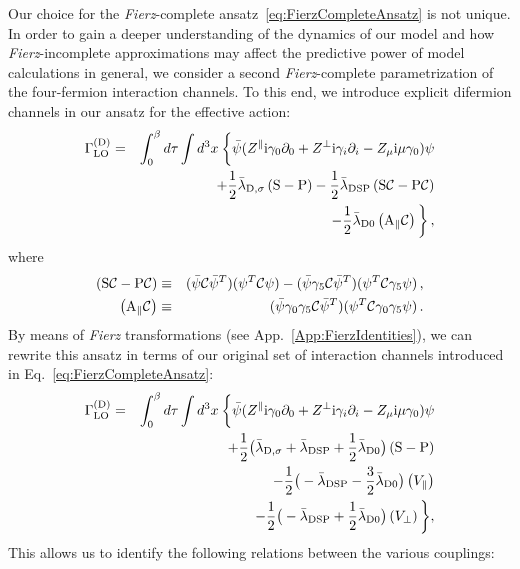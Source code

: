 \documentclass[prd,english,preprintnumbers,amsmath,amssymb,nofootinbib,twocolumn,superscriptaddress]{revtex4-1}
\def\CC{{\mathcal C}}
\newcommand{\I}{\mathrm{i}}
\newcommand{\be}{\begin{eqnarray}}
\newcommand{\ee}{\end{eqnarray}}
\newcommand{\del}{\partial}
\newcommand{\nn}{\nonumber }
\newcommand{\psib}{\bar{\psi}}
\begin{document}
{{Our choice for the {\it Fierz}-complete ansatz~\eqref{eq:FierzCompleteAnsatz} is not unique. In order to gain a deeper understanding of
the dynamics of our model and how {\it Fierz}-incomplete approximations may affect the predictive power of model calculations
in general, we consider a second {\it Fierz}-complete parametrization of the four-fermion interaction channels. To this end, 
we introduce explicit difermion channels in our ansatz for the effective {action: 
%
\be
\Gamma_\text{LO}^\text{(D)} &=&  \int_0 ^\beta d \tau  \int d^3 x \: \bigg \lbrace \psib ( Z^\parallel \I \gamma_0 \del_0 + Z^\perp \I \gamma_i \del_i -  Z_\mu \I \mu \gamma_0 ) \psi \nn \\
& & \hspace{1.4cm} + \frac 1 2 \bar \lambda_{\text{D},\sigma} \left(\text{S} - \text{P} \right) - \frac 1 2 \bar  \lambda _\text{DSP} \left( \text{S} \CC - \text{P} \CC \right)   \nn \\
& &\hspace{2.8cm} - \frac 1 2 \bar  \lambda_\text{D0} \left( \text A _\parallel \CC\right) \bigg \rbrace\,,
\label{eq:dfans}
\ee
%
where}
%
\be
\left( \text{S} \CC - \text{P} \CC \right) &\equiv& (\psib \CC \psib ^ T)(\psi^T \CC \psi) - (\psib \gamma_5 \CC \psib^T)(\psi^T \CC \gamma_5 \psi)\,, \nn\\
\left( \text A _\parallel \CC\right) &\equiv&  (\psib \gamma_0 \gamma_5 \CC \psib^T) (\psi^T \CC \gamma_0 \gamma_5 \psi)\,.
\ee
%
By means of {\it Fierz} transformations (see App.~\ref{App:FierzIdentities}), 
we can rewrite this ansatz
in terms of our original set of interaction channels {introduced in Eq.~\eqref{eq:FierzCompleteAnsatz}:
%
\be
\Gamma_\text{LO}^\text{(D)} &=&  \int_0 ^\beta d \tau  \int d^3 x \: \bigg \lbrace \psib ( Z^\parallel \I \gamma_0 \del_0 + Z^\perp \I \gamma_i \del_i -  Z_\mu \I \mu \gamma_0 ) \psi \nn \\
& &\hspace{2.2cm} + \frac 1 2 \big( \bar \lambda_{\text{D},\sigma} +  \bar \lambda_\text{DSP} + \frac 1 2 \bar \lambda_\text{D0} \big) \left( \text S - \text P \right) \nn \\
& &\hspace{2.2cm}- \frac 1 2 \big( - \bar \lambda_\text{DSP} -\frac 3 2 \bar \lambda _\text{D0} \big) \left( V_\parallel \right) \nn \\
& &\hspace{2.2cm}- \frac 1 2 \big( - \bar \lambda _\text{DSP} + \frac 1 2 \bar \lambda_\text{D0} \big) \left( V_\perp \right) \bigg \rbrace,
\ee
%
%
This} allows us to identify the following relations between the various {couplings:
}}}
\end{document}
